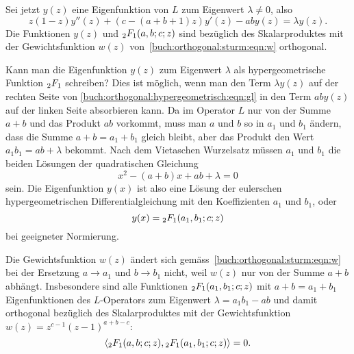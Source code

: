 Sei jetzt $y(z)$ eine Eigenfunktion von $L$ zum Eigenwert $\lambda\ne 0$,
also
\begin{equation}
z(1-z)y''(z) + (c-(a+b+1)z)y'(z) - ab y(z) = \lambda y(z).
\label{buch:orthogonal:hypergeometrisch:eqn:gl}
\end{equation}
Die Funktionen $y(z)$ und $\mathstrut_2F_1(a,b;c;z)$ sind bezüglich
des Skalarproduktes mit der Gewichtsfunktion $w(z)$
von~\eqref{buch:orthogonal:sturm:eqn:w} orthogonal.

Kann man die Eigenfunktion $y(z)$  zum Eigenwert $\lambda$ als
hypergeometrische Funktion $\mathstrut_2F_1$ schreiben?
Dies ist möglich, wenn man den Term $\lambda y(z)$ auf der rechten
Seite von \eqref{buch:orthogonal:hypergeometrisch:eqn:gl}
in den Term $aby(z)$ auf der linken Seite absorbieren kann.
Da im Operator $L$ nur von der Summe $a+b$ und das Produkt
$ab$ vorkommt,
muss man $a$ und $b$ so in $a_1$ und $b_1$ ändern, dass die Summe
$a+b=a_1+b_1$ gleich bleibt, aber das Produkt den Wert $a_1b_1=ab+\lambda$
bekommt.
Nach dem Vietaschen Wurzelsatz müssen
%
%
$a_1$ und $b_1$ die beiden Lösungen der quadratischen Gleichung
\[
x^2 - (a+b)x + ab+\lambda = 0
\]
sein.
Die Eigenfunktion $y(x)$ ist also eine Lösung der eulerschen
hypergeometrischen Differentialgleichung mit den Koeffizienten
$a_1$ und $b_1$, oder
\[
y(x) = \mathstrut_2F_1(a_1,b_1;c;z)
\]
bei geeigneter Normierung.

Die Gewichtsfunktion $w(z)$ ändert sich
gemäss~\eqref{buch:orthogonal:sturm:eqn:w} bei der Ersetzung $a\to a_1$
und $b\to b_1$ nicht, weil $w(z)$ nur von der Summe 
$a+b$ abhängt.
Insbesondere sind alle Funktionen $\mathstrut_2F_1(a_1,b_1;c;z)$
mit $a+b=a_1+b_1$ Eigenfunktionen des $L$-Operators zum Eigenwert
$\lambda=a_1b_1-ab$
und damit orthogonal bezüglich des Skalarproduktes
mit der Gewichtsfunktion $w(z)=z^{c-1}(z-1)^{a+b-c}$:
\[
\langle
\mathstrut_2F_1(a,b;c;z),
\mathstrut_2F_1(a_1,b_1;c;z)
\rangle
=
0.
\]






